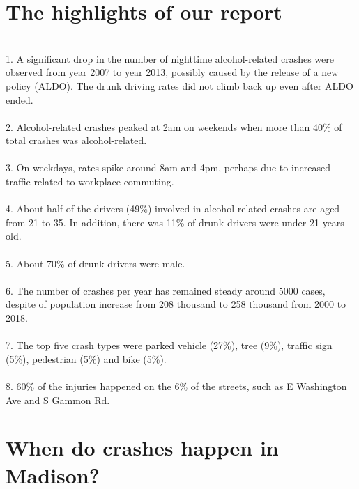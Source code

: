 \documentclass[15pt]{article}
\begin{document}
\section{The highlights of our report}
~\\
1. A significant drop in the number of nighttime alcohol-related crashes were observed from year 2007 to year 2013, possibly caused by the release of a new policy (ALDO). The drunk driving rates did not climb back up even after ALDO ended.
~\\
~\\
2. Alcohol-related crashes peaked at 2am on weekends when more than 40\% of total crashes was alcohol-related.
~\\
~\\
3. On weekdays, rates spike around 8am and 4pm, perhaps due to increased traffic related to workplace commuting. 
~\\
~\\
4. About half of the drivers (49\%) involved in alcohol-related crashes are aged from 21 to 35. In addition, there was 11\% of drunk drivers were under 21 years old. 
~\\
~\\
5. About 70\% of drunk drivers were male.
~\\
~\\
6. The number of crashes per year has remained steady around 5000 cases, despite of population increase from 208 thousand to 258 thousand from 2000 to 2018. 
~\\
~\\
7. The top five crash types were parked vehicle (27\%), tree (9\%), traffic sign (5\%), pedestrian (5\%) and bike (5\%).
~\\
~\\
8. 60\% of the injuries happened on the 6\% of the streets, such as E Washington Ave and S Gammon Rd. 

\newpage
\section{When do crashes happen in Madison?}
\end{document}
